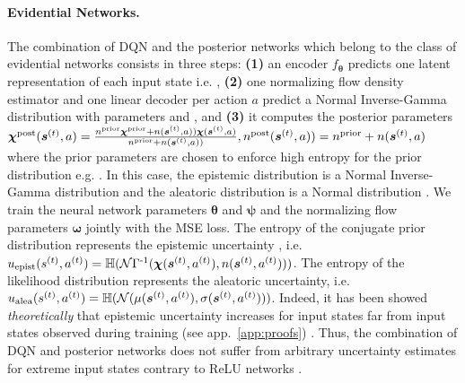 \paragraph{Evidential Networks.} The combination of DQN and the posterior networks \cite{natpn, charpentier2020}  which belong to the class of evidential networks consists in three steps: \textbf{(1)} an encoder $ f_{\bm{\theta}}$ predicts one latent representation of each input state i.e. , \textbf{(2)} one normalizing flow density estimator  and one linear decoder  per action $a$ predict a Normal Inverse-Gamma distribution  with parameters  and , and \textbf{(3)} it computes the posterior parameters $\bm{\chi}^\text{post}(\bm{s}^{(t)}, a) = \frac{n^\text{prior}\bm{\chi}^\text{prior} + n(\bm{s}^{(t)}, a)) \bm{\chi}(\bm{s}^{(t)}, a)}{n^\text{prior} + n(\bm{s}^{(t)}, a))}, n^\text{post}(\bm{s}^{(t)}, a)) = n^\text{prior} + n(\bm{s}^{(t)}, a)$ where the prior parameters are chosen to enforce high entropy for the prior distribution e.g.  \cite{natpn}. In this case, the epistemic distribution is a Normal Inverse-Gamma distribution and the aleatoric distribution is a Normal distribution \cite{natpn}. We train the neural network parameters $\bm{\theta}$ and $\bm{\psi}$ and the normalizing flow parameters $\bm{\omega}$ jointly with the MSE loss. The entropy of the conjugate prior distribution represents the epistemic uncertainty , i.e. $u_\text{epist}(s^{(t)}, a^{(t)}) = \operatorname{\mathbb{H}}(\operatorname{\mathcal{N}\Gamma^{-1}}(\bm{\chi}(\bm{s}^{(t)}, a^{(t)}), n(\bm{s}^{(t)}, a^{(t)})))$. The entropy of the likelihood distribution represents the aleatoric uncertainty, i.e. $u_\text{alea}(s^{(t)}, a^{(t)}) = \operatorname{\mathbb{H}}(\operatorname{\mathcal{N}}(\mu(\bm{s}^{(t)}, a^{(t)}), \sigma(\bm{s}^{(t)}, a^{(t)})))$. Indeed, it has been showed \emph{theoretically} that epistemic uncertainty increases for input states far from input states observed during training (see app.~\ref{app:proofs}) \cite{natpn}. Thus, the combination of DQN and posterior networks does not suffer from arbitrary uncertainty estimates for extreme input states contrary to ReLU networks \cite{overconfident-relu}.

